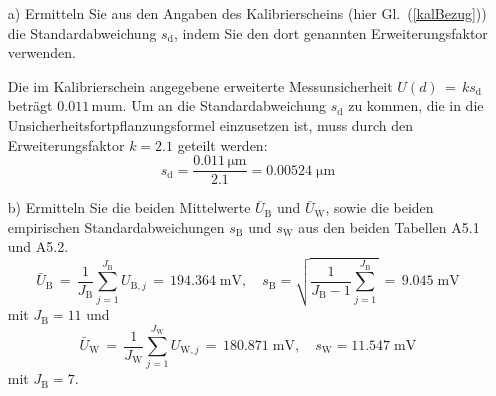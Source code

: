 \begin{itemize}
\item[a)] Ermitteln Sie aus den Angaben des Kalibrierscheins (hier Gl.~(\ref{kalBezug}))
die Standardabweichung $s_\mathrm{d}$, indem Sie den dort genannten Erweiterungsfaktor verwenden.

Die im Kalibrierschein angegebene erweiterte Messunsicherheit $U(d)\, = \, k s_\mathrm{d}$
beträgt $0.011 \, \mathrm{mu m}$. Um an die Standardabweichung $s_\mathrm{d}$ zu kommen,
die in die Unsicherheitsfortpflanzungsformel einzusetzen ist,
muss durch den Erweiterungsfaktor $k = 2.1$ geteilt werden:
$$
s_\mathrm{d} = \frac{0.011 \, \mathrm{\mu m}}{2.1} = 0.00524 \; \mathrm{\mu m}
$$
\item[b)] Ermitteln Sie die beiden Mittelwerte $\bar U_\mathrm{B}$ und $\bar U_\mathrm{W}$,
sowie die beiden empirischen Standardabweichungen $s_\mathrm{B}$ und $s_\mathrm{W}$
aus den beiden Tabellen A5.1 und A5.2.
$$
\bar U_\mathrm{B} \, = \, \frac{1}{J_\mathrm{B}}\sum\limits_{j=1}^{J_\mathrm{B}}  U_{\mathrm{B},j}
\, = \, 194.364 \; \mathrm{mV},
\quad
 s_\mathrm{B}  = \sqrt{\frac{1}{J_\mathrm{B}-1}\sum\limits_{j=1}^{J_\mathrm{B}}} \, = \,
 9.045 \; \mathrm{mV}
$$
mit $J_\mathrm{B} = 11$ und
$$
\bar U_\mathrm{W} \, =  \, \frac{1}{J_\mathrm{W}}\sum\limits_{j=1}^{J_\mathrm{W}}  U_{\mathrm{W},j}
\, = \, 180.871 \; \mathrm{mV}, \quad s_\mathrm{W}  =  11.547 \; \mathrm{mV}
$$
mit $J_\mathrm{B} = 7$.


\end{itemize}
